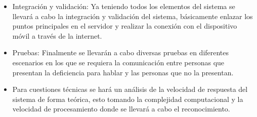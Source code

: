 \begin{itemize}
		\item Integración y validación: Ya teniendo todos los elementos del sistema se llevará a cabo la integración y validación del sistema, básicamente enlazar los puntos principales en el servidor y realizar la conexión con el dispositivo móvil a través de la internet.

		\item Pruebas: Finalmente se llevarán a cabo diversas pruebas en diferentes escenarios en los que se requiera la comunicación entre personas que presentan la deficiencia para hablar y las personas que no la presentan.

		\item Para cuestiones técnicas se hará un análisis de la velocidad de respuesta del sistema de forma teórica, esto tomando la complejidad computacional y la velocidad de procesamiento donde se llevará a cabo el reconocimiento.
	\end{itemize}